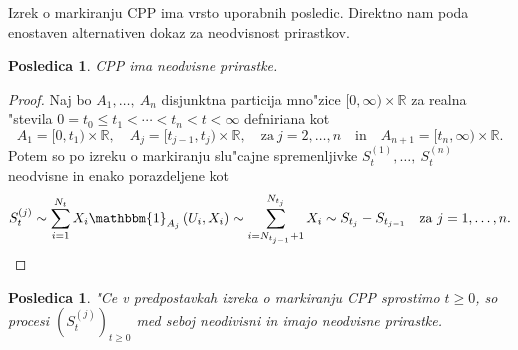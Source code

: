 \documentclass[12pt, a4paper, reqno]{amsart}
\theoremstyle{definition}
\theoremstyle{plain}
\newtheorem{posledica}[definicija]{Posledica}
\newcommand{\R}{\mathbb{R}}
\newcommand{\1}{\mathds{1}}
\begin{document}
        Izrek o markiranju CPP ima vrsto uporabnih posledic. Direktno nam poda enostaven
        alternativen dokaz za neodvisnost prirastkov.

        \begin{posledica}
            CPP ima neodvisne prirastke.
        \end{posledica}

        \begin{proof}
            Naj bo $A_1, \dots, \ A_n$ disjunktna particija 
            mno"zice $[0, \infty) \times \R$ za realna "stevila $0=t_0\leq t_1 < \cdots < t_n < t < \infty$ defniriana kot
            \begin{equation*}
                A_1 = [0, t_1)\times \R, \quad A_j = [t_{j-1}, t_j)\times \R, \quad \text{za} \ j = 2, \dots, n \quad \text{in} \quad A_{n + 1} = [t_{n}, \infty)\times \R.
            \end{equation*}
            Potem so po izreku o markiranju slu"cajne spremenljivke $S_{t}^{(1)}, \dots, \ S_{t}^{(n)}$ neodvisne in enako
            porazdeljene kot 
            \begin{align*}
                S^{(j)}_{t} \sim \sum_{i=1}^{N_t}X_i\mathbbm{1}_{A_j}\left(U_i, X_i\right)\sim
                \sum_{i = N_{t_{j-1}}+ 1}^{N_{t_j}}X_i \sim S_{t_j} - S_{t_{j-1}} \quad \text{za} \ j = 1, \dots, n.
            \end{align*}
        \end{proof}

        \begin{posledica}
            "Ce v predpostavkah izreka o markiranju CPP sprostimo $t\geq0$, so procesi $(S_t^{(j)})_{t\geq0}$ 
            med seboj neodivisni in imajo neodvisne prirastke. 
            \label{pos:neodvisnostCPPmedSabo}
        \end{posledica}
\end{document}
